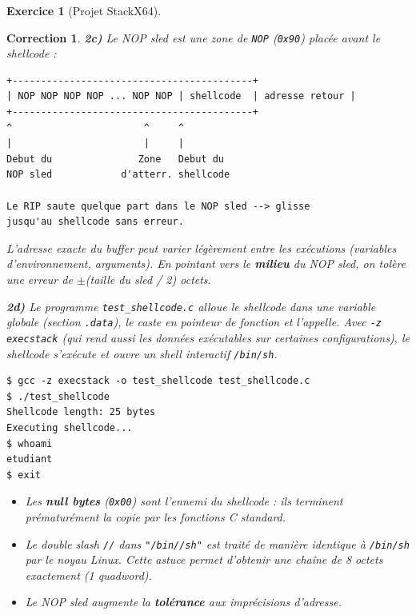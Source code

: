 \documentclass[a4paper,11pt]{article}
\theoremstyle{plain}
\newtheorem{correction}{Correction}
\theoremstyle{definition}
\newtheorem{exercice}{Exercice}
\begin{document}
\begin{exercice}[Projet StackX64]
\begin{correction}
\textbf{2c)} Le NOP sled est une zone de \texttt{NOP} (\texttt{0x90}) placée avant le shellcode :
\begin{lstlisting}[style=GDBStyle]
+------------------------------------------+
| NOP NOP NOP NOP ... NOP NOP | shellcode  | adresse retour |
+------------------------------------------+
^                       ^     ^
|                       |     |
Debut du               Zone   Debut du
NOP sled            d'atterr. shellcode

Le RIP saute quelque part dans le NOP sled --> glisse
jusqu'au shellcode sans erreur.
\end{lstlisting}

L'adresse exacte du buffer peut varier légèrement entre les exécutions (variables d'environnement, arguments). En pointant vers le \textbf{milieu} du NOP sled, on tolère une erreur de $\pm$(taille du sled / 2) octets.

\textbf{2d)} Le programme \texttt{test\_shellcode.c} alloue le shellcode dans une variable globale (section \texttt{.data}), le caste en pointeur de fonction et l'appelle. Avec \texttt{-z execstack} (qui rend aussi les données exécutables sur certaines configurations), le shellcode s'exécute et ouvre un shell interactif \texttt{/bin/sh}.

\begin{lstlisting}[style=GDBStyle]
$ gcc -z execstack -o test_shellcode test_shellcode.c
$ ./test_shellcode
Shellcode length: 25 bytes
Executing shellcode...
$ whoami
etudiant
$ exit
\end{lstlisting}

\begin{pointcle}
\begin{itemize}
    \item Les \textbf{null bytes} (\texttt{0x00}) sont l'ennemi du shellcode : ils terminent prématurément la copie par les fonctions C standard.
    \item Le double slash \texttt{//} dans \texttt{"/bin//sh"} est traité de manière identique à \texttt{/bin/sh} par le noyau Linux. Cette astuce permet d'obtenir une chaîne de 8 octets exactement (1 quadword).
    \item Le NOP sled augmente la \textbf{tolérance} aux imprécisions d'adresse.
\end{itemize}
\end{pointcle}

\end{correction}




\end{exercice}
\end{document}
